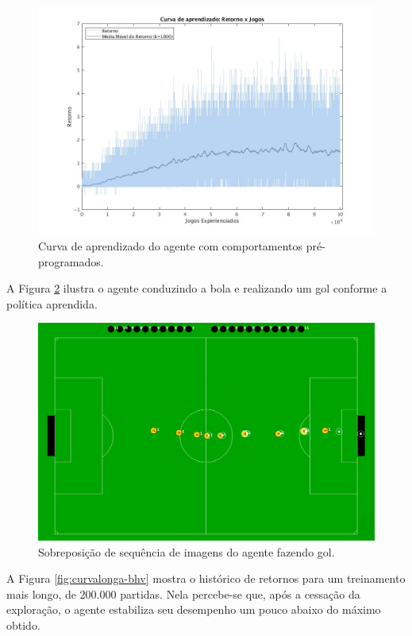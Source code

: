 \begin{figure}[H]
	\includegraphics[width=0.95\linewidth]{figs/curva-behaviors-tabular.jpg}
	\centering
	\caption{Curva de aprendizado do agente com comportamentos pré-programados.}
	\label{fig:single-agent-tabular-behaviors}
\end{figure}

A Figura \ref{fig:goal-seq} ilustra o agente conduzindo a bola e realizando um gol conforme a política aprendida.

\begin{figure}[H]
	\includegraphics[width=0.9\linewidth]{figs/goal-sequence.png}
	\centering
	\caption{Sobreposição de sequência de imagens do agente fazendo gol.}
	\label{fig:goal-seq}
\end{figure}

A Figura \ref{fig:curvalonga-bhv} mostra o histórico de retornos para um treinamento mais longo, de 200.000 partidas. Nela percebe-se que, após a cessação da exploração, o agente estabiliza seu desempenho um pouco abaixo do máximo obtido.

